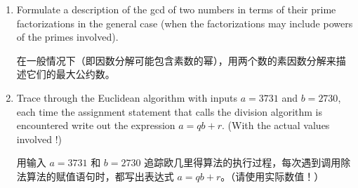 \begin{enumerate}
{  对于这么小的数，你可以直接找出它们的素因数分解并加以利用，不过，通过追踪欧几里得算法来找出最大公约数，然后使用公式
  \[ \lcm (a,b) = \frac{ab}{\gcd (a,b)。} \]
  来练习你对该算法的理解，可能会很有用。
  }
  
  \workbookpagebreak
  
  \item Formulate a description of the gcd of two numbers in terms of
    their prime factorizations in the general case (when the
    factorizations may 
  include powers of the primes involved).
  
  在一般情况下（即因数分解可能包含素数的幂），用两个数的素因数分解来描述它们的最大公约数。
  
  \wbvfill
  
  
  \item Trace through the Euclidean algorithm with inputs $a=3731$ and
    $b=2730$, each time the assignment statement that calls the division
    algorithm is encountered write out the expression $a=qb+r$.
  (With the
    actual values involved !) 
    
    用输入 $a=3731$ 和 $b=2730$ 追踪欧几里得算法的执行过程，每次遇到调用除法算法的赋值语句时，都写出表达式 $a=qb+r$。（请使用实际数值！）
  
  \wbvfill
  
  
  \end{enumerate}